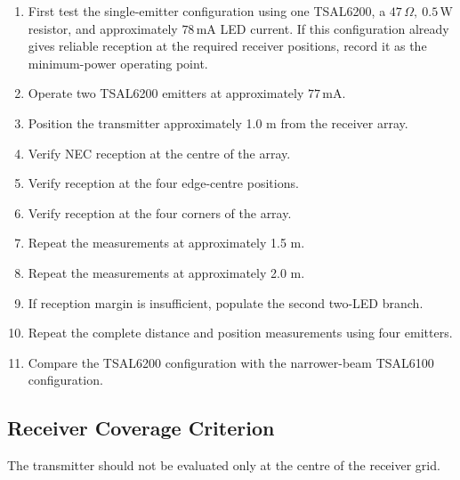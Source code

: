 \documentclass[a4paper,12pt]{article}
\begin{document}
\begin{enumerate}

    \item First test the single-emitter configuration using one TSAL6200,
    a \(47\,\Omega,\ 0.5\,\text{W}\) resistor, and approximately
    \(78\,\text{mA}\) LED current. If this configuration already gives
    reliable reception at the required receiver positions, record it as the
    minimum-power operating point.

    \item Operate two TSAL6200 emitters at approximately
    \(77\,\text{mA}\).

    \item Position the transmitter approximately 1.0 m from the receiver
    array.

    \item Verify NEC reception at the centre of the array.

    \item Verify reception at the four edge-centre positions.

    \item Verify reception at the four corners of the array.

    \item Repeat the measurements at approximately 1.5 m.

    \item Repeat the measurements at approximately 2.0 m.

    \item If reception margin is insufficient, populate the second
    two-LED branch.

    \item Repeat the complete distance and position measurements using
    four emitters.

    \item Compare the TSAL6200 configuration with the narrower-beam
    TSAL6100 configuration.

\end{enumerate}



\subsection{Receiver Coverage Criterion}

The transmitter should not be evaluated only at the centre of the
receiver grid.
\end{document}
